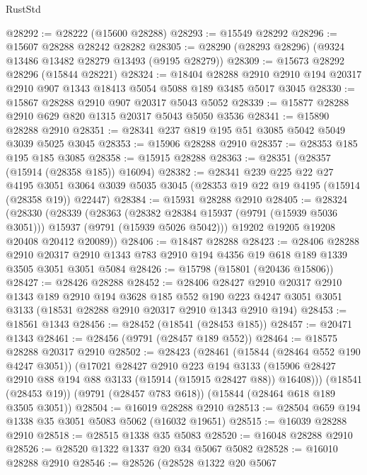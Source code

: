 \begin{lexlean}{RustStd}
\begin{coremodule}
@28292 := @28222 (@15600 @28288)
@28293 := @15549 @28292
@28296 := @15607 @28288 @28242 @28282
@28305 := @28290 (@28293 @28296) (@9324 @13486 @13482 @28279 @13493 (@9195 @28279))
@28309 := @15673 @28292 @28296 (@15844 @28221)
@28324 := @18404
    @28288
    @2910
    @2910
    @194
    @20317
    @2910
    @907
    @1343
    @18413
    @5054
    @5088
    @189
    @3485
    @5017
    @3045
@28330 := @15867 @28288 @2910 @907 @20317 @5043 @5052
@28339 := @15877 @28288 @2910 @629 @820 @1315 @20317 @5043 @5050 @3536
@28341 := @15890 @28288 @2910
@28351 := @28341 @237 @819 @195 @51 @3085 @5042 @5049 @3039 @5025 @3045
@28353 := @15906 @28288 @2910
@28357 := @28353 @185 @195 @185 @3085
@28358 := @15915 @28288
@28363 := @28351 (@28357 (@15914 (@28358 @185)) @16094)
@28382 := @28341
    @239
    @225
    @22
    @27
    @4195
    @3051
    @3064
    @3039
    @5035
    @3045
    (@28353 @19 @22 @19 @4195 (@15914 (@28358 @19)) @22447)
@28384 := @15931 @28288 @2910
@28405 := @28324
    (@28330
      (@28339
        (@28363
          (@28382 @28384 @15937 (@9791 (@15939 @5036 @3051)))
          @15937
          (@9791 (@15939 @5026 @5042)))
        @19202
        @19205
        @19208
        @20408
        @20412
        @20089))
@28406 := @18487 @28288
@28423 := @28406
    @28288
    @2910
    @20317
    @2910
    @1343
    @783
    @2910
    @194
    @4356
    @19
    @618
    @189
    @1339
    @3505
    @3051
    @3051
    @5084
@28426 := @15798 (@15801 (@20436 @15806))
@28427 := @28426 @28288
@28452 := @28406
    @28427
    @2910
    @20317
    @2910
    @1343
    @189
    @2910
    @194
    @3628
    @185
    @552
    @190
    @223
    @4247
    @3051
    @3051
    @3133
    (@18531 @28288 @2910 @20317 @2910 @1343 @2910 @194)
@28453 := @18561 @1343
@28456 := @28452 (@18541 (@28453 @185))
@28457 := @20471 @1343
@28461 := @28456 (@9791 (@28457 @189 @552))
@28464 := @18575 @28288 @20317 @2910
@28502 := @28423
    (@28461
      (@15844 (@28464 @552 @190 @4247 @3051))
      (@17021
        @28427
        @2910
        @223
        @194
        @3133
        (@15906 @28427 @2910 @88 @194 @88 @3133 (@15914 (@15915 @28427 @88)) @16408)))
    (@18541 (@28453 @19))
    (@9791 (@28457 @783 @618))
    (@15844 (@28464 @618 @189 @3505 @3051))
@28504 := @16019 @28288 @2910
@28513 := @28504 @659 @194 @1338 @35 @3051 @5083 @5062 (@16032 @19651)
@28515 := @16039 @28288 @2910
@28518 := @28515 @1338 @35 @5083
@28520 := @16048 @28288 @2910
@28526 := @28520 @1322 @1337 @20 @34 @5067 @5082
@28528 := @16010 @28288 @2910
@28546 := @28526
    (@28528
      @1322
      @20
      @5067

\end{coremodule}
\end{lexlean}

